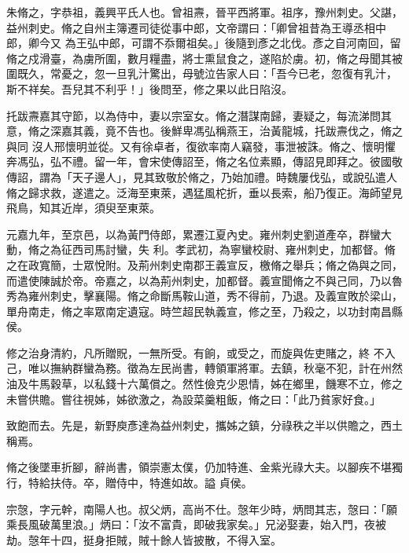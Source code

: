 
\begin{pinyinscope}

 朱脩之，字恭祖，義興平氏人也。曾祖燾，晉平西將軍。祖序，豫州刺史。父諶，益州刺史。脩之自州主簿遷司徒從事中郎，文帝謂曰：「卿曾祖昔為王導丞相中郎，卿今又
 為王弘中郎，可謂不忝爾祖矣。」後隨到彥之北伐。彥之自河南回，留脩之戍滑臺，為虜所圍，數月糧盡，將士熏鼠食之，遂陷於虜。初，脩之母聞其被圍既久，常憂之，忽一旦乳汁驚出，母號泣告家人曰：「吾今已老，忽復有乳汁，斯不祥矣。吾兒其不利乎！」後問至，修之果以此日陷沒。



 托跋燾嘉其守節，以為侍中，妻以宗室女。脩之潛謀南歸，妻疑之，每流涕問其意，脩之深嘉其義，竟不告也。後鮮卑馮弘稱燕王，治黃龍城，托跋燾伐之，脩之與同
 沒人邢懷明並從。又有徐卓者，復欲率南人竊發，事泄被誅。脩之、懷明懼奔馮弘，弘不禮。留一年，會宋使傳詔至，脩之名位素顯，傳詔見即拜之。彼國敬傳詔，謂為「天子邊人」，見其致敬於脩之，乃始加禮。時魏屢伐弘，或說弘遣人脩之歸求救，遂遣之。泛海至東萊，遇猛風柁折，垂以長索，船乃復正。海師望見飛鳥，知其近岸，須臾至東萊。



 元嘉九年，至京邑，以為黃門侍郎，累遷江夏內史。雍州刺史劉道產卒，群蠻大動，脩之為征西司馬討蠻，失
 利。孝武初，為寧蠻校尉、雍州刺史，加都督。脩之在政寬簡，士眾悅附。及荊州刺史南郡王義宣反，檄脩之舉兵；脩之偽與之同，而遣使陳誠於帝。帝嘉之，以為荊州刺史，加都督。義宣聞脩之不與己同，乃以魯秀為雍州刺史，擊襄陽。脩之命斷馬鞍山道，秀不得前，乃退。及義宣敗於梁山，單舟南走，脩之率眾南定遺寇。時竺超民執義宣，修之至，乃殺之，以功封南昌縣侯。



 修之治身清約，凡所贈貺，一無所受。有餉，或受之，而旋與佐吏賭之，終
 不入己，唯以撫納群蠻為務。徵為左民尚書，轉領軍將軍。去鎮，秋毫不犯，計在州然油及牛馬穀草，以私錢十六萬償之。然性儉克少恩情，姊在鄉里，饑寒不立，修之未嘗供贍。嘗往視姊，姊欲激之，為設菜羹粗飯，脩之曰：「此乃貧家好食。」



 致飽而去。先是，新野庾彥達為益州刺史，攜姊之鎮，分祿秩之半以供贍之，西土稱焉。



 脩之後墜車折腳，辭尚書，領崇憲太僕，仍加特進、金紫光祿大夫。以腳疾不堪獨行，特給扶侍。卒，贈侍中，特進如故。謚
 貞侯。



 宗愨，字元幹，南陽人也。叔父炳，高尚不仕。愨年少時，炳問其志，愨曰：「願乘長風破萬里浪。」炳曰：「汝不富貴，即破我家矣。」兄泌娶妻，始入門，夜被劫。愨年十四，挺身拒賊，賊十餘人皆披散，不得入室。




\end{pinyinscope}
